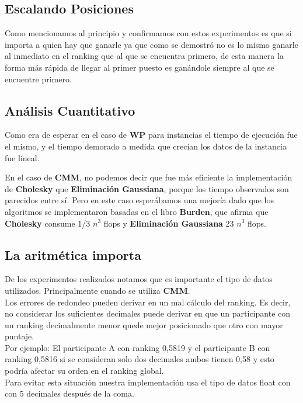 \subsection{Escalando Posiciones}
Como mencionamos al principio y confirmamos con estos experimentos es que si importa a quien hay que ganarle ya que como se demostró no es lo mismo ganarle al inmediato en el 
ranking que al que se encuentra primero,
de esta manera la forma más rápida de llegar al primer puesto es ganándole siempre al que se encuentre primero.

\subsection{Análisis Cuantitativo}

Como era de esperar en el caso de \textbf{WP} para instancias el tiempo de ejecución fue el mismo, y el tiempo demorado a medida que crecían los datos de la instancia fue lineal.

En el caso de \textbf{CMM}, no podemos decir que fue m\'as eficiente la implementación de \textbf{Cholesky} que \textbf{Eliminación Gaussiana}, porque los tiempo observados son parecidos entre sí. 
Pero en este caso esperábamos una mejoría dado que los algoritmos se implementaron basadas en el libro \textbf{Burden}, que afirma que \textbf{Cholesky} consume 1/3 $n^3$ flops y 
\textbf{Eliminación Gaussiana} 2\/3 $n^3$ flops.


\subsection{La aritmética importa}

De los experimentos realizados notamos que es importante el tipo de datos utilizados. Principalmente cuando se utiliza \textbf{CMM}.
\\

Los errores de redondeo pueden derivar en un mal cálculo del ranking. Es decir, no considerar los suficientes decimales puede derivar en que un participante con un ranking
decimalmente menor quede mejor posicionado que otro con mayor puntaje.\\

Por ejemplo: El participante A con ranking 0,5819 y el participante B con ranking 0,5816 si se consideran solo dos decimales ambos tienen 0,58 y esto podría afectar su orden 
en el ranking global. \\

Para evitar esta situación nuestra implementación usa el tipo de datos float con con 5 decimales después de la coma.\\


